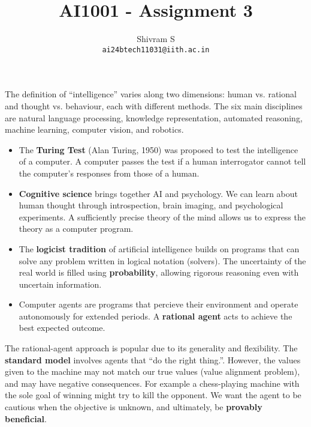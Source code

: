 \documentclass{article}
\title{AI1001 - Assignment 3}
\author{Shivram S \\ \texttt{ai24btech11031@iith.ac.in}}
\begin{document}
\maketitle

The definition of ``intelligence'' varies along two dimensions: human vs. rational and
thought vs. behaviour, each with different methods. The six main
disciplines are natural language processing, knowledge representation, automated reasoning,
machine learning, computer vision, and robotics.

\begin{itemize}
    \item The {\bf Turing Test} (Alan Turing, 1950) was proposed to test the intelligence of a computer.
    A computer passes the test if a human interrogator cannot tell the computer's responses from
    those of a human. 

    \item {\bf Cognitive science} brings together AI and psychology. We can learn about human
    thought through introspection, brain imaging, and psychological experiments. A sufficiently
    precise theory of the mind allows us to express the theory as a computer program.

    \item The {\bf logicist tradition} of artificial intelligence builds on programs that can
    solve any problem written in logical notation (solvers). The uncertainty of the real world
    is filled using \textbf{probability}, allowing rigorous reasoning even with uncertain information.

    \item Computer agents are programs that percieve their environment and operate autonomously
    for extended periods. A {\bf rational agent} acts to achieve the best expected outcome.
\end{itemize}


The rational-agent approach is popular due to its generality and flexibility. The
\textbf{standard model} involves agents that ``do the right thing.''. However, the values
given to the machine may not match our true values (value alignment problem), and
may have negative consequences. For example a chess-playing machine with the sole goal of
winning might try to kill the opponent. We want the agent to be cautious when the objective is
unknown, and ultimately, be \textbf{provably beneficial}. 
\end{document}
